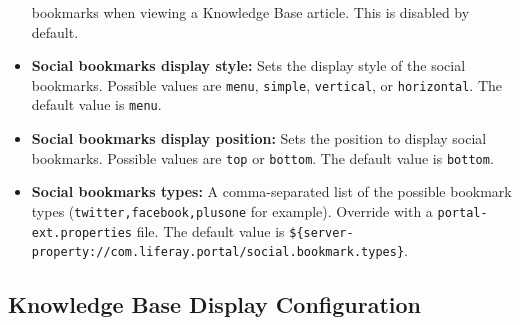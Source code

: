 \begin{itemize}
  bookmarks when viewing a Knowledge Base article. This is disabled by
  default.
\item
  \textbf{Social bookmarks display style:} Sets the display style of the
  social bookmarks. Possible values are \texttt{menu}, \texttt{simple},
  \texttt{vertical}, or \texttt{horizontal}. The default value is
  \texttt{menu}.
\item
  \textbf{Social bookmarks display position:} Sets the position to
  display social bookmarks. Possible values are \texttt{top} or
  \texttt{bottom}. The default value is \texttt{bottom}.
\item
  \textbf{Social bookmarks types:} A comma-separated list of the
  possible bookmark types (\texttt{twitter,facebook,plusone} for
  example). Override with a \texttt{portal-ext.properties} file. The
  default value is
  \texttt{\$\{server-property://com.liferay.portal/social.bookmark.types\}}.
\end{itemize}

\subsection{Knowledge Base Display
Configuration}\label{knowledge-base-display-configuration}

